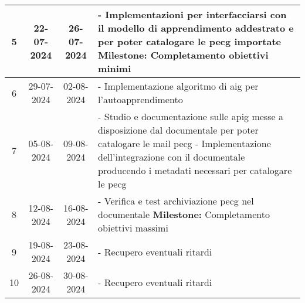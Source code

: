 \begin{longtable}{|c|c|c|p{8cm}|}
    \hline
    5                  & 22-07-2024   & 26-07-2024  &
    - Implementazioni per interfacciarsi con il modello di apprendimento addestrato e per poter catalogare le \gls{pecg} importate \newline
    \textbf{Milestone:} Completamento obiettivi minimi                                                           \\
    \hline
    6                  & 29-07-2024   & 02-08-2024  &
    - Implementazione algoritmo di \gls{aig} per l’autoapprendimento                                                    \\
    \hline
    7                  & 05-08-2024   & 09-08-2024  &
    - Studio e documentazione sulle \gls{apig} messe a disposizione dal documentale per poter catalogare le mail \gls{pecg} \newline
    - Implementazione dell’integrazione con il documentale producendo i metadati necessari per catalogare le \gls{pecg} \\
    \hline
    8                  & 12-08-2024   & 16-08-2024  &
    - Verifica e test archiviazione \gls{pecg} nel documentale \newline
    \textbf{Milestone:} Completamento obiettivi massimi                                                          \\
    \hline
    9                  & 19-08-2024   & 23-08-2024  &
    - Recupero eventuali ritardi                                                                                 \\
    \hline
    10                 & 26-08-2024   & 30-08-2024  &
    - Recupero eventuali ritardi                                                                                 \\
    \hline

\end{longtable}